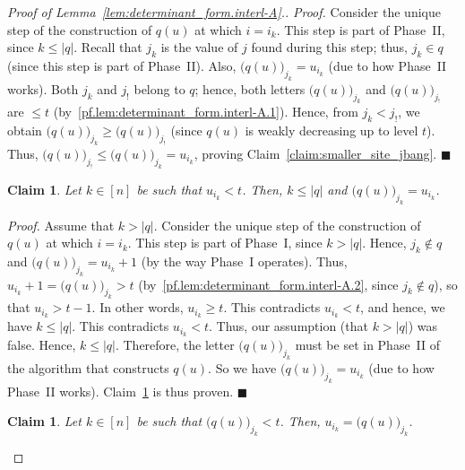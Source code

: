 \documentclass[reqno]{amsart}
\newcommand{\0}{\phantom{c}}
\newenvironment{subproof}{\textit{Proof.} }{\hfill$\blacksquare$ \medskip}
\newenvironment{verlong}{}{}
\newenvironment{vershort}{}{}
\newcommand{\abs}[1]{\left| #1 \right|}
\newcommand{\ive}[1]{\left[ #1 \right]}
\theoremstyle{plain}
\newtheorem{claim}[thm]{Claim}
\theoremstyle{definition}
\numberwithin{equation}{section}
\begin{document}
\begin{proof}[Proof of Lemma~\ref{lem:determinant_form.interl-A}.]
\begin{subproof}
Consider the unique step of the construction of $q(u) $ at which  $i=i_k$.
This step is part of Phase~II, since $k\leq \abs{q}$.
Recall that $j_k$ is the value of $j$ found during this step; thus, $j_k\in q$ (since this step is part of Phase~II). Also, $\bigl( q(u) \bigr)_{j_k} = u_{i_k}$ (due to how Phase~II works).
Both $j_k$ and $j_{!}$ belong to $q$; hence, both letters $\bigl( q(u) \bigr)_{j_k}$ and $\bigl( q(u) \bigr)_{j_{!}}$ are $\leq t$ (by~\eqref{pf.lem:determinant_form.interl-A.1}).
Hence, from $j_k < j_{!}$, we obtain $\bigl( q(u) \bigr)_{j_k} \geq \bigl( q(u) \bigr)_{j_{!}}$ (since $q(u)$ is weakly decreasing up to level $t$).
Thus, $\bigl( q(u) \bigr)_{j_{!}} \leq \bigl( q(u) \bigr)_{j_k} = u_{i_k}$, proving Claim~\ref{claim:smaller_site_jbang}.
\end{subproof}

\begin{claim}
\label{claim:pf.lem:determinant_form.interl-A.b.1}
Let $k\in \ive{n}$ be such that $u_{i_k} < t$. Then, $k \leq \abs{q}$ and $\bigl( q(u) \bigr)_{j_k} = u_{i_k}$.
\end{claim}

\begin{subproof}
Assume that $k > \abs{q}$.
Consider the unique step of the construction of $q(u)$ at which $i = i_k$.
This step is part of Phase~I, since $k > \abs{q}$.
Hence, $j_k \notin q$ and $\bigl( q(u) \bigr)_{j_k} = u_{i_k}+1$ (by the way Phase~I operates).
Thus, $u_{i_k}+1 = \bigl( q(u) \bigr)_{j_k} > t$ (by~\eqref{pf.lem:determinant_form.interl-A.2}, since $j_k\notin q$), so that $u_{i_k} > t-1$.
In other words, $u_{i_k} \geq t$.
\begin{vershort}
This contradicts $u_{i_k} < t$, and hence, we have $k \leq \abs{q}$.
\end{vershort}
\begin{verlong}
This contradicts $u_{i_k} < t$.
Thus, our assumption (that $k > \abs{q}$) was false.
Hence, $k \leq \abs{q}$.
\end{verlong}
Therefore, the letter $\bigl( q(u) \bigr)_{j_k}$ must be set in Phase~II of the algorithm that constructs $q(u)$.
So we have $\bigl( q(u) \bigr)_{j_k} = u_{i_k}$ (due to how Phase~II works).
Claim~\ref{claim:pf.lem:determinant_form.interl-A.b.1} is thus proven.
\end{subproof}

\begin{claim}
\label{claim:pf.lem:determinant_form.interl-A.b.for_surj}
Let $k \in \ive{n}$ be such that $\bigl( q(u) \bigr)_{j_k} < t$. Then, $u_{i_k} = \bigl( q(u) \bigr)_{j_k}$.
\end{claim}


\end{proof}
\end{document}
